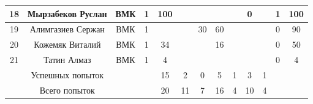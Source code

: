 \documentclass[10pt, a4paper]{article}
\begin{document}
\begin{center}
\begin{longtable}{|c|c|c|c|*{7}{c|}c|c|}
\hline
18 &
Мырзабеков Руслан &
ВМК & 1 &
100 &
  &
  &
  &
  &
0 &
  &
1 &
100 \\
\hline
19 &
Алимгазиев Сержан &
ВМК & 1 &
  &
  &
30 &
60 &
  &
  &
  &
0 &
90 \\
\hline
20 &
Кожемяк Виталий &
ВМК & 1 &
34 &
  &
  &
16 &
  &
  &
  &
0 &
50 \\
\hline
21 &
Татин Алмаз &
ВМК & 1 &
4 &
  &
  &
  &
  &
  &
  &
0 &
4 \\
\hline
 & Успешных попыток & & &
15 &
2 &
0 &
5 &
1 &
3 &
1 & & \\
\hline 
 & Всего попыток & & &
20 &
11 &
7 &
16 &
4 &
10 &
4 & & \\
\hline 
\end{longtable} 
\end{center}
\end{document}
